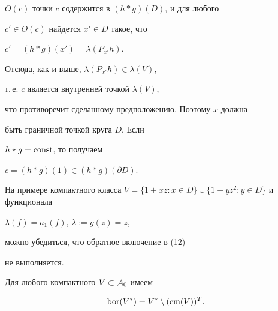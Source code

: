 \begin{pf}
$O(c)$ точки $c$ содержится в $(h*g)(D)$, и для любого 


$c'\in O(c)$ найдется $x'\in D$ такое, что 


$c'= (h*g)(x')= \lambda(P_{x'} h)$. 


Отсюда, как и выше, $\lambda(P_{x'} h) \in \lambda(V)$, 


т.\,е. $c$ является внутренней точкой $\lambda(V)$, 


что противоречит сделанному предположению. Поэтому $x$ должна 


быть граничной точкой круга $D$. Если 


$h*g = \operatorname{const}$, то получаем 


$c = (h*g)(1) \in (h*g)(\partial D)$.





На примере компактного класса $V = \{ 1 +xz: x \in \overline{D} \} \cup 


\{ 1 +yz^2: y \in \overline{D} \}$ и функционала 


$\lambda (f) = a_1 (f)$, $\lambda := g(z) = z$, 


можно убедиться, что обратное включение в (12)


не выполняется.


\end{pf}





\begin{thm}


Для любого компактного $V\subset{\cal A}_0$ имеем 


$$


\bor (V^* )= V^* \setminus ( \cm (V))^T.


$$


\end{thm}





